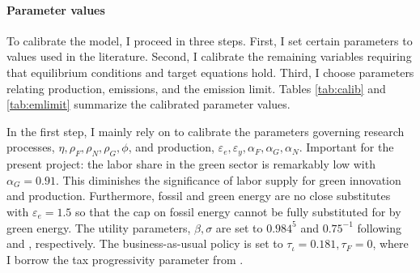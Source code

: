 \paragraph{Parameter values}
To calibrate the model, I proceed in three steps. First, I set certain parameters to values used in the literature. Second, I calibrate the remaining variables requiring that equilibrium conditions and target equations hold. Third, I choose parameters relating production, emissions, and the emission limit. Tables \ref{tab:calib} and \ref{tab:emlimit} summarize the calibrated parameter values.

In the first step, I mainly rely on \cite{Fried2018ClimateAnalysis} to calibrate the parameters governing research processes, $\eta, \rho_F,\rho_N, \rho_G, \phi $, and production, $\varepsilon_e, \varepsilon_y, \alpha_F, \alpha_G, \alpha_N$.  Important for the present project: the labor share in the green sector is remarkably low with $\alpha_G=0.91$. This diminishes the significance of labor supply for green innovation and production. Furthermore, fossil and green energy are no close substitutes with $\varepsilon_e=1.5$ so that the cap on fossil energy cannot be fully substituted for by green energy. The utility parameters, $\beta, \sigma$ are set to $0.984^5$ and $0.75^{-1}$ following \cite{Barrage2019OptimalPolicy} and \cite{Chetty2011AreMargins}, respectively. The business-as-usual policy is set to $\tau_\iota=0.181, \tau_F=0$, where I borrow the tax progressivity parameter from \cite{Heathcote2017OptimalFramework}. 

